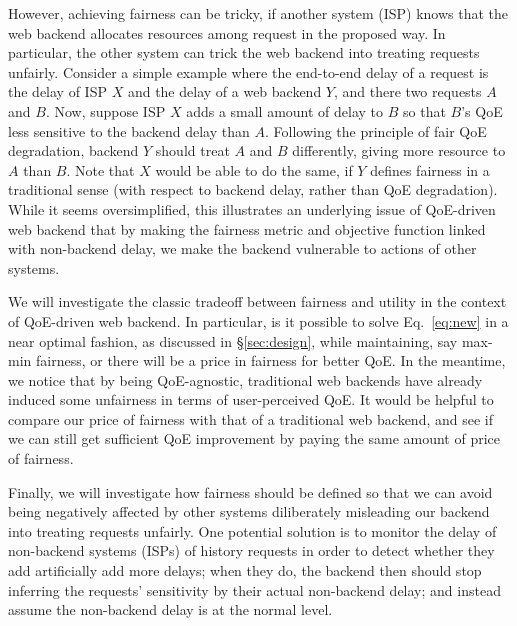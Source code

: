 
However, achieving fairness can be tricky, if another system (\eg ISP) knows that the web backend allocates resources among request in the proposed way. In particular, the other system can trick the web backend into treating requests unfairly.
Consider a simple example where the end-to-end delay of a request is the delay of ISP $X$ and the delay of a web backend $Y$, and there  two requests $A$ and $B$.
Now, suppose ISP $X$ adds a small amount of delay to $B$ so that $B$'s QoE less sensitive to the backend delay than $A$. Following the principle of fair QoE degradation, backend $Y$ should treat $A$ and $B$ differently, giving more resource to $A$ than $B$. 
Note that $X$ would be able to do the same, if $Y$ defines fairness in a traditional sense (\ie with respect to backend delay, rather than QoE degradation).
While it seems oversimplified, this illustrates an underlying issue of QoE-driven web backend that by making the fairness metric and objective function linked with non-backend delay, we make the backend vulnerable to actions of other systems.

We will investigate the classic tradeoff between fairness and utility in the context of QoE-driven web backend. In particular, is it possible to solve Eq.~\ref{eq:new} in a near optimal fashion, as discussed in \S\ref{sec:design}, while maintaining, say max-min fairness, or there will be a price in fairness for better QoE.
In the meantime, we notice that by being QoE-agnostic, traditional web backends have already induced some unfairness in terms of user-perceived QoE. It would be helpful to compare our price of fairness with that of a traditional web backend, and see if we can still get sufficient QoE improvement by paying the same amount of price of fairness.

Finally, we will investigate how fairness should be defined so that we can avoid being negatively affected by other systems diliberately misleading our backend into treating requests unfairly. One potential solution is to monitor the delay of non-backend systems (\eg ISPs) of history requests in order to detect whether they add artificially add more delays; when they do, the backend then should stop inferring the requests' sensitivity by their actual non-backend delay; and instead assume the non-backend delay is at the normal level.


